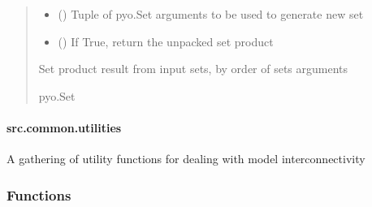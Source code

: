 \documentclass[letterpaper,10pt,english]{sphinxmanual}
\begin{document}
\begin{fulllineitems}
\begin{fulllineitems}
\begin{quote}
\begin{description}
\begin{itemize}
\item {} 
\sphinxAtStartPar
{} () \textendash{} Tuple of pyo.Set arguments to be used to generate new set

\item {} 
\sphinxAtStartPar
{} () \textendash{} If True, return the unpacked set product

\end{itemize}

\sphinxAtStartPar
{} \textendash{} Set product result from input sets, by order of sets arguments

\sphinxAtStartPar
pyo.Set

\end{description}\end{quote}

\end{fulllineitems}


\end{fulllineitems}


\sphinxstepscope


\paragraph{src.common.utilities}
\label{\detokenize{src.common.utilities:module-src.common.utilities}}\label{\detokenize{src.common.utilities:src-common-utilities}}\label{\detokenize{src.common.utilities::doc}}
\sphinxAtStartPar
A gathering of utility functions for dealing with model interconnectivity
\subsubsection*{Functions}
\end{document}
